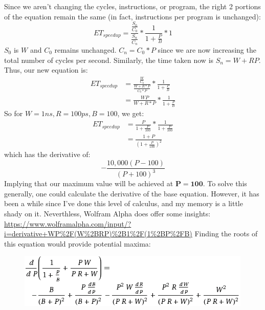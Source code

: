 \documentclass{article}
\begin{document}
Since we aren't changing the cycles, instructions, or program, the right 2 portions of the equation remain the same (in fact, instructions per program is unchanged):
\begin{equation*}
ET_{speedup} = \frac{\frac{S_0}{C_0}}{\frac{S_n}{C_n}} * \frac{1}{1+\frac{P}{B}}*1
\end{equation*}
$S_0$ is $W$ and $C_0$ remains unchanged.  $C_n = C_0*P$ since we are now increasing the total number of cycles per second.  Similarly, the time taken now is $S_n = W+RP$.  Thus, our new equation is:
\begin{eqnarray*}
ET_{speedup} & = \frac{\frac{W}{C_0}}{\frac{W+R*P}{C_0*P}} * \frac{1}{1+\frac{P}{B}}\\
& = \frac{WP}{W+R*P} * \frac{1}{1+\frac{P}{B}}
\end{eqnarray*}
So for $W=1ns, R=100ps, B = 100$, we get:
\begin{eqnarray*}
ET_{speedup} & = \frac{P}{1+\frac{P}{100}} * \frac{1}{1+\frac{P}{100}}\\
& = \frac{1+P}{(1+\frac{P}{100})^2}
\end{eqnarray*}
which has the derivative of:
\begin{equation*}
-\frac{10,000(P-100)} {(P+100)^3}
\end{equation*}
Implying that our maximum value will be achieved at $\mathbf{P = 100}$.
\newpage
To solve this generally, one could calculate the derivative of the base equation.  However, it has been a while since I've done this level of calculus, and my memory is a little shady on it.  Neverthless, Wolfram Alpha does offer some insights: \url{https://www.wolframalpha.com/input/?i=derivative+WP\%2F(W\%2BRP)\%2B1\%2F(1\%2BP\%2FB)}
Finding the roots of this equation would provide potential maxima:\\
\begin{figure}
\centering
\includegraphics[width=.8\textwidth]{derivative.png}
\end{figure}
\end{document}
